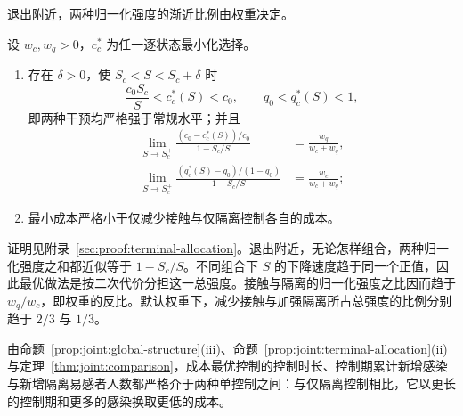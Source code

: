 退出附近，两种归一化强度的渐近比例由权重决定。
\begin{proposition}
\label{prop:joint:terminal-allocation}
设 $w_c,w_q>0$，$c_c^*$ 为任一逐状态最小化选择。
\begin{enumerate}
\renewcommand{\labelenumi}{(\roman{enumi})}
\item 存在 $\delta>0$，使 $S_c<S<S_c+\delta$ 时
\begin{equation}
\frac{c_0S_c}{S}<c_c^*(S)<c_0,
\qquad q_0<q_c^*(S)<1,
\label{eq:joint:terminal-interior}
\end{equation}
即两种干预均严格强于常规水平；并且
\begin{equation}
\begin{aligned}
\lim_{S\to S_c^{+}}
\frac{(c_0-c_c^*(S))/c_0}{1-S_c/S}&=\frac{w_q}{w_c+w_q},\\
\lim_{S\to S_c^{+}}
\frac{(q_c^*(S)-q_0)/(1-q_0)}{1-S_c/S}&=\frac{w_c}{w_c+w_q};
\end{aligned}
\label{eq:joint:terminal-ratio}
\end{equation}
\item 最小成本严格小于仅减少接触与仅隔离控制各自的成本。
\end{enumerate}
\end{proposition}
证明见附录~\ref{sec:proof:terminal-allocation}。退出附近，无论怎样组合，两种归一化强度之和都近似等于 $1-S_c/S$。不同组合下 $S$ 的下降速度趋于同一个正值，因此最优做法是按二次代价分担这一总强度。接触与隔离的归一化强度之比因而趋于 $w_q/w_c$，即权重的反比。默认权重下，减少接触与加强隔离所占总强度的比例分别趋于 $2/3$ 与 $1/3$。

由命题~\ref{prop:joint:global-structure}(iii)、命题~\ref{prop:joint:terminal-allocation}(ii) 与定理~\ref{thm:joint:comparison}，成本最优控制的控制时长、控制期累计新增感染与新增隔离易感者人数都严格介于两种单控制之间：与仅隔离控制相比，它以更长的控制期和更多的感染换取更低的成本。

